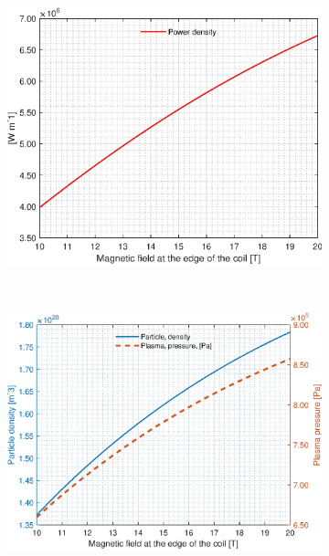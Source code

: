 \begin{figure}[H]
	\begin{subfigure}[b]{.45\textwidth}
		\includegraphics[width=\textwidth]{MatlabFigures/Bmax/f5.eps}
	\end{subfigure}
	~
	\begin{subfigure}[b]{.45\textwidth}
		\includegraphics[width=\textwidth]{MatlabFigures/Bmax/f6.eps}
	\end{subfigure}


\end{figure}

